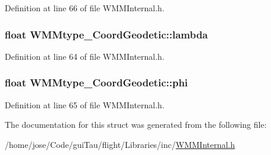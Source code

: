 Definition at line 66 of file W\-M\-M\-Internal.\-h.

\hypertarget{struct_w_m_mtype___coord_geodetic_aaf9acfaad6b8964779cbd7f0bfa96170}{
\subsubsection[{lambda}]{\setlength{\rightskip}{0pt plus 5cm}float W\-M\-Mtype\-\_\-\-Coord\-Geodetic\-::lambda}}\label{struct_w_m_mtype___coord_geodetic_aaf9acfaad6b8964779cbd7f0bfa96170}


Definition at line 64 of file W\-M\-M\-Internal.\-h.

\hypertarget{struct_w_m_mtype___coord_geodetic_a830561cbe026055e7aadb6c004b31f08}{
\subsubsection[{phi}]{\setlength{\rightskip}{0pt plus 5cm}float W\-M\-Mtype\-\_\-\-Coord\-Geodetic\-::phi}}\label{struct_w_m_mtype___coord_geodetic_a830561cbe026055e7aadb6c004b31f08}


Definition at line 65 of file W\-M\-M\-Internal.\-h.



The documentation for this struct was generated from the following file\-:\begin{DoxyCompactItemize}
\item 
/home/jose/\-Code/gui\-Tau/flight/\-Libraries/inc/\hyperlink{_w_m_m_internal_8h}{W\-M\-M\-Internal.\-h}\end{DoxyCompactItemize}
